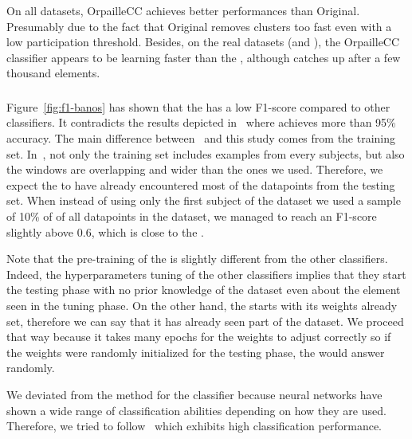 On all datasets, \mcnn OrpailleCC achieves better performances than \mcnn
Original. Presumably due to the fact that \mcnn Original removes clusters too
fast even with a low participation threshold.  Besides, on the real datasets
(\banosdataset and \recofitdataset), the \mcnn OrpailleCC classifier appears to
be learning faster than the \mondrianforest, although \mondrianforest catches
up after a few thousand elements. 

\subsubsection{\FNN}
Figure~\ref{fig:f1-banos} has shown that the \FNN has a low
F1-score compared to other classifiers. It contradicts the results
depicted in~\cite{omid_2019} where \FNN achieves more than 95\% 
accuracy. The main difference between~\cite{omid_2019} and this study comes
from the training set. In~\cite{omid_2019}, not only the training set includes examples from every
subjects, but also the windows are overlapping and wider than the ones we used.
Therefore, we expect the \FNN to have already encountered
most of the datapoints from the testing set. When instead of using only the
first subject of the \banosdataset dataset we used a sample of 10\% of of all datapoints in the \banosdataset dataset, we
managed to reach an F1-score slightly above 0.6, which is close to the \naivebayes.

Note that the pre-training of the \FNN is slightly different from the other
classifiers. Indeed, the hyperparameters tuning of the other classifiers
implies that they start the testing phase with no prior knowledge of the
dataset even about the element seen in the tuning phase. On the other hand, the
\FNN starts with its weights already set, therefore we can say that it has
already seen part of the dataset. We proceed that way because it takes many
epochs for the weights to adjust correctly so if the weights were randomly
initialized for the testing phase, the \FNN would answer randomly.

We deviated from the method for the \FNN classifier because neural networks have
shown a wide range of classification abilities depending on how they are used.
Therefore, we tried to follow~\cite{omid_2019} which exhibits high classification
performance.

